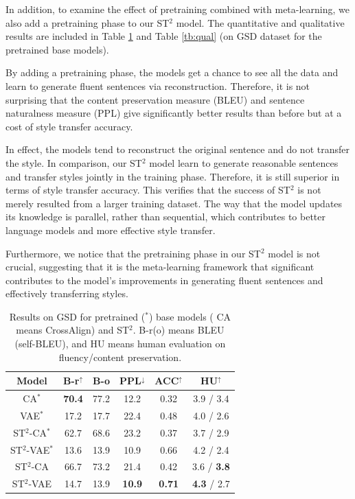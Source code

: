 In addition, to examine the effect of pretraining combined with meta-learning, we also add a pretraining phase to our ST$^2$ model. The quantitative and qualitative results are included in Table \ref{tb:exp2} and Table \ref{tb:qual} (on GSD dataset for the pretrained base models).

By adding a pretraining phase, the models get a chance to see all the data and learn to generate fluent sentences via reconstruction. Therefore, it is not surprising that the content preservation measure (BLEU) and sentence naturalness measure (PPL) give significantly better results than before but at a cost of style transfer accuracy. 

In effect, the models tend to reconstruct the original sentence and do not transfer the style. In comparison, our ST$^2$ model learn to generate reasonable sentences and transfer styles jointly in the training phase. Therefore, it is still superior in terms of style transfer accuracy. This verifies that the success of ST$^2$ is not merely resulted from a larger training dataset. The way that the model updates its knowledge is parallel, rather than sequential, which contributes to better language models and more effective style transfer.

Furthermore, we notice that the pretraining phase in our ST$^2$ model is not crucial, suggesting that it is the meta-learning framework that significant contributes to the model's improvements in generating fluent sentences and effectively transferring styles.

\begin{table}[th]\footnotesize
	\centering
	\begin{tabular}{c|ccccc}
		\hline
		\textbf{Model} & \textbf{B-r}$^\uparrow$ & \textbf{B-o} & \textbf{PPL}$^\downarrow$ & \textbf{ACC}$^\uparrow$ & \textbf{HU}$^\uparrow$ \\
		\hline
		CA$^*$ & \textbf{70.4} & 77.2 & 12.2 & 0.32 & 3.9 / 3.4 \\
		VAE$^*$ & 17.2 & 17.7 & 22.4 & 0.48 & 4.0 / 2.6 \\
		\hline
		ST$^2$-CA$^*$ & 62.7 & 68.6 & 23.2 & 0.37 & 3.7 / 2.9 \\
		ST$^2$-VAE$^*$ & 13.6 & 13.9 & 10.9 & 0.66  & 4.2 / 2.4 \\
		\hline
		ST$^2$-CA & 66.7 & 73.2 & 21.4 & 0.42 & 3.6 / \textbf{3.8} \\
		ST$^2$-VAE & 14.7 & 13.9 & \textbf{10.9} & \textbf{0.71} & \textbf{4.3} / 2.7 \\
		\hline
	\end{tabular}
	\caption{Results on GSD for pretrained ($^*$) base models ( CA means CrossAlign) and ST$^2$. B-r(o) means BLEU (self-BLEU), and HU means human evaluation on fluency/content preservation.}\label{tb:exp2}
\end{table}

